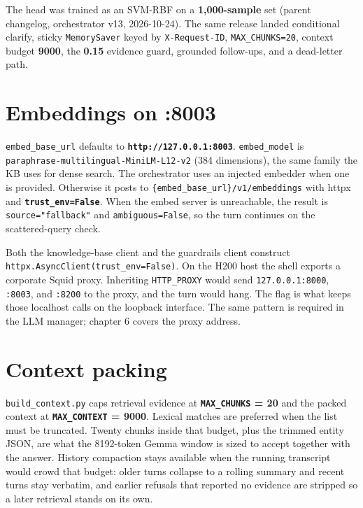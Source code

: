 The head was trained as an SVM-RBF on a \textbf{1,000-sample} set (parent changelog, orchestrator v13, 2026-10-24). The same release landed conditional clarify, sticky \texttt{MemorySaver} keyed by \texttt{X-Request-ID}, \texttt{MAX\_CHUNKS=20}, context budget \textbf{9000}, the \textbf{0.15} evidence guard, grounded follow-ups, and a dead-letter path.

\section{Embeddings on :8003}\label{embeddings-on-8003}

\texttt{embed\_base\_url} defaults to \textbf{\texttt{http://127.0.0.1:8003}}. \texttt{embed\_model} is \texttt{paraphrase-multilingual-MiniLM-L12-v2} (384 dimensions), the same family the KB uses for dense search. The orchestrator uses an injected embedder when one is provided. Otherwise it posts to \texttt{\{embed\_base\_url\}/v1/embeddings} with httpx and \textbf{\texttt{trust\_env=False}}. When the embed server is unreachable, the result is \texttt{source="fallback"} and \texttt{ambiguous=False}, so the turn continues on the scattered-query check.

Both the knowledge-base client and the guardrails client construct \texttt{httpx.AsyncClient(trust\_env=False)}. On the H200 host the shell exports a corporate Squid proxy. Inheriting \texttt{HTTP\_PROXY} would send \texttt{127.0.0.1:8000}, \texttt{:8003}, and \texttt{:8200} to the proxy, and the turn would hang. The flag is what keeps those localhost calls on the loopback interface. The same pattern is required in the LLM manager; chapter 6 covers the proxy address.

\section{Context packing}\label{context-packing}

\texttt{build\_context.py} caps retrieval evidence at \textbf{\texttt{MAX\_CHUNKS} = 20} and the packed context at \textbf{\texttt{MAX\_CONTEXT} = 9000}. Lexical matches are preferred when the list must be truncated. Twenty chunks inside that budget, plus the trimmed entity JSON, are what the 8192-token Gemma window is sized to accept together with the answer. History compaction stays available when the running transcript would crowd that budget: older turns collapse to a rolling summary and recent turns stay verbatim, and earlier refusals that reported no evidence are stripped so a later retrieval stands on its own.

